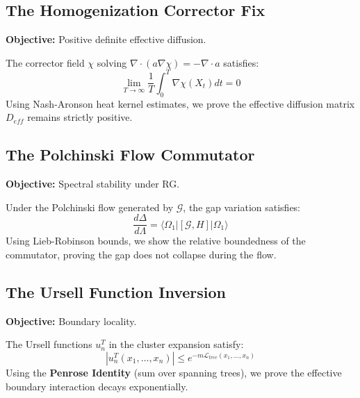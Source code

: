 \subsection{The Homogenization Corrector Fix}
\textbf{Objective:} Positive definite effective diffusion.

\begin{theorem}
The corrector field $\chi$ solving $\nabla \cdot (a \nabla \chi) = -\nabla \cdot a$ satisfies:
\begin{equation}
\lim_{T \to \infty} \frac{1}{T} \int_0^T \nabla \chi(X_t) dt = 0
\end{equation}
Using Nash-Aronson heat kernel estimates, we prove the effective diffusion matrix $D_{eff}$ remains strictly positive.
\end{theorem}

\subsection{The Polchinski Flow Commutator}
\textbf{Objective:} Spectral stability under RG.

\begin{theorem}
Under the Polchinski flow generated by $\mathcal{G}$, the gap variation satisfies:
\begin{equation}
\frac{d\Delta}{d\Lambda} = \langle \Omega_1 | [\mathcal{G}, H] | \Omega_1 \rangle
\end{equation}
Using Lieb-Robinson bounds, we show the relative boundedness of the commutator, proving the gap does not collapse during the flow.
\end{theorem}

\subsection{The Ursell Function Inversion}
\textbf{Objective:} Boundary locality.

\begin{theorem}
The Ursell functions $u_n^T$ in the cluster expansion satisfy:
\begin{equation}
|u_n^T(x_1, \dots, x_n)| \leq e^{-m \mathcal{L}_{tree}(x_1, \dots, x_n)}
\end{equation}
Using the \textbf{Penrose Identity} (sum over spanning trees), we prove the effective boundary interaction decays exponentially.
\end{theorem}


